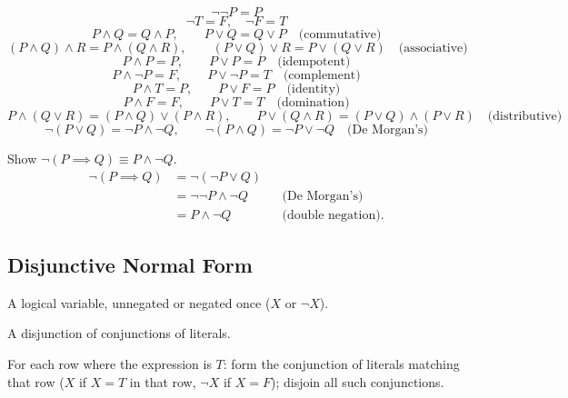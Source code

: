 \documentclass[11pt]{article}
\begin{document}
\begin{note}
\[
\neg\neg P = P
\]
\[
\neg T = F, \quad \neg F = T
\]
\[
P\wedge Q = Q\wedge P, \qquad P\vee Q = Q\vee P \quad \text{(commutative)}
\]
\[
(P\wedge Q)\wedge R = P\wedge(Q\wedge R), \qquad (P\vee Q)\vee R = P\vee(Q\vee R) \quad \text{(associative)}
\]
\[
P\wedge P = P, \qquad P\vee P = P \quad \text{(idempotent)}
\]
\[
P\wedge\neg P = F, \qquad P\vee\neg P = T \quad \text{(complement)}
\]
\[
P\wedge T = P, \qquad P\vee F = P \quad \text{(identity)}
\]
\[
P\wedge F = F, \qquad P\vee T = T \quad \text{(domination)}
\]
\[
P\wedge(Q\vee R)=(P\wedge Q)\vee(P\wedge R), \qquad P\vee(Q\wedge R)=(P\vee Q)\wedge(P\vee R) \quad \text{(distributive)}
\]
\[
\neg(P\vee Q)=\neg P\wedge\neg Q, \qquad \neg(P\wedge Q)=\neg P\vee\neg Q \quad \text{(De Morgan's)}
\]
\end{note}

\bigskip
\begin{example}
Show $\neg(P\implies Q) \equiv P \wedge \neg Q$.
\begin{align*}
\neg(P\implies Q) &= \neg(\neg P \vee Q) \\
&= \neg\neg P \wedge \neg Q && \text{(De Morgan's)}\\
&= P \wedge \neg Q && \text{(double negation)}.
\end{align*}
\end{example}

\subsection{Disjunctive Normal Form}
\label{sec:4-16}

\begin{definition}[Literal]
A logical variable, unnegated or negated once ($X$ or $\neg X$).
\end{definition}

\begin{definition}[DNF]
A disjunction of conjunctions of literals.
\end{definition}

\begin{note}
For each row where the expression is $T$: form the conjunction of literals matching that row ($X$ if $X=T$ in that row, $\neg X$ if $X=F$); disjoin all such conjunctions.
\end{note}
\end{document}
